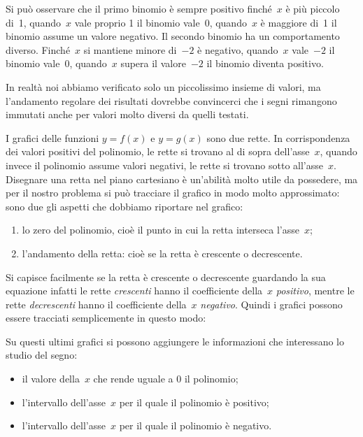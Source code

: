 Si può osservare che il primo binomio è sempre positivo finché~\(x\) è più 
piccolo di~1, quando~\(x\) vale proprio 1 il binomio vale~0, quando~\(x\) è 
maggiore di~1 il binomio assume un valore negativo.
Il secondo binomio ha un comportamento diverso. Finché~\(x\) si mantiene 
minore di~\(-2\) è negativo, quando~\(x\) vale~\(-2\) il binomio vale~0, 
quando~\(x\) supera il valore~\(-2\) il binomio diventa positivo.

In realtà noi abbiamo verificato solo un piccolissimo insieme di valori, 
ma l'andamento regolare dei risultati dovrebbe convincerci che i segni 
rimangono immutati anche per valori molto diversi da quelli testati.

I grafici delle funzioni \(y=f(x)\) e \(y=g(x)\) sono due rette. 
In corrispondenza dei valori positivi del polinomio, le rette si trovano al 
di sopra dell'asse~\(x\), %
quando invece il polinomio assume valori negativi, le rette si trovano 
sotto all'asse~\(x\). %
Disegnare una retta nel piano cartesiano è un'abilità molto utile da 
possedere, ma per il nostro problema si può tracciare il grafico in modo 
molto approssimato: sono due gli aspetti che dobbiamo riportare nel 
grafico:

\medskip
\begin{enumerate} [nosep]
\item lo zero del polinomio, cioè il punto in cui la retta interseca 
l'asse~\(x\);
\item l'andamento della retta: cioè se la retta è crescente o decrescente.
\end{enumerate}
 
\medskip
Si capisce facilmente se la retta è crescente o decrescente guardando la 
sua equazione infatti le rette \emph{crescenti} hanno il coefficiente 
della~\(x\) \emph{positivo}, mentre le rette \emph{decrescenti} hanno il 
coefficiente della~\(x\) \emph{negativo}.
Quindi i grafici possono essere tracciati semplicemente in questo modo:

Su questi ultimi grafici si possono aggiungere le informazioni che 
interessano lo studio del segno:

\medskip
\begin{itemize} [nosep]
\item il valore della~\(x\) che rende uguale a 0 il polinomio;
\item l'intervallo dell'asse~\(x\) per il quale il polinomio è positivo;
\item l'intervallo dell'asse~\(x\) per il quale il polinomio è negativo.
\end{itemize}

